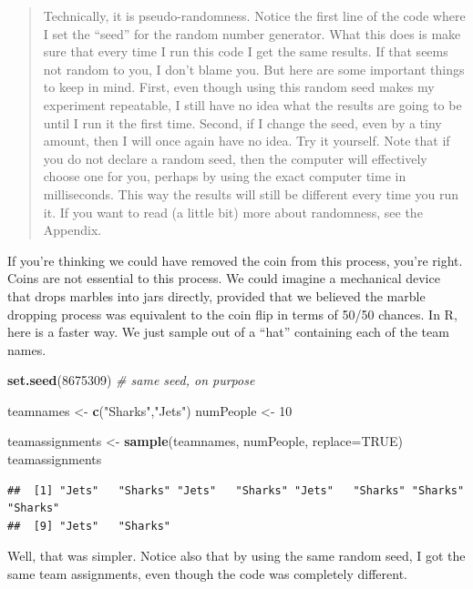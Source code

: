 \documentclass[openany]{book}
\newenvironment{Shaded}{\begin{snugshade}}{\end{snugshade}}
\newcommand{\CommentTok}[1]{\textcolor[rgb]{0.56,0.35,0.01}{\textit{#1}}}
\newcommand{\DataTypeTok}[1]{\textcolor[rgb]{0.13,0.29,0.53}{#1}}
\newcommand{\DecValTok}[1]{\textcolor[rgb]{0.00,0.00,0.81}{#1}}
\newcommand{\KeywordTok}[1]{\textcolor[rgb]{0.13,0.29,0.53}{\textbf{#1}}}
\newcommand{\NormalTok}[1]{#1}
\newcommand{\OtherTok}[1]{\textcolor[rgb]{0.56,0.35,0.01}{#1}}
\newcommand{\StringTok}[1]{\textcolor[rgb]{0.31,0.60,0.02}{#1}}
\begin{document}
\begin{quote}
Technically, it is pseudo-randomness. Notice the first line of the code where I set the ``seed'' for the random number generator. What this does is make sure that every time I run this code I get the same results. If that seems not random to you, I don't blame you. But here are some important things to keep in mind. First, even though using this random seed makes my experiment repeatable, I still have no idea what the results are going to be until I run it the first time. Second, if I change the seed, even by a tiny amount, then I will once again have no idea. Try it yourself. Note that if you do not declare a random seed, then the computer will effectively choose one for you, perhaps by using the exact computer time in milliseconds. This way the results will still be different every time you run it. If you want to read (a little bit) more about randomness, see the Appendix.
\end{quote}

If you're thinking we could have removed the coin from this process, you're right. Coins are not essential to this process. We could imagine a mechanical device that drops marbles into jars directly, provided that we believed the marble dropping process was equivalent to the coin flip in terms of 50/50 chances. In R, here is a faster way. We just sample out of a ``hat'' containing each of the team names.

\begin{Shaded}
\begin{Highlighting}[]
\KeywordTok{set.seed}\NormalTok{(}\DecValTok{8675309}\NormalTok{) }\CommentTok{# same seed, on purpose}

\NormalTok{teamnames <-}\StringTok{ }\KeywordTok{c}\NormalTok{(}\StringTok{"Sharks"}\NormalTok{,}\StringTok{"Jets"}\NormalTok{)}
\NormalTok{numPeople <-}\StringTok{ }\DecValTok{10}

\NormalTok{teamassignments <-}\StringTok{ }\KeywordTok{sample}\NormalTok{(teamnames, numPeople, }\DataTypeTok{replace=}\OtherTok{TRUE}\NormalTok{)}
\NormalTok{teamassignments}
\end{Highlighting}
\end{Shaded}

\begin{verbatim}
##  [1] "Jets"   "Sharks" "Jets"   "Sharks" "Jets"   "Sharks" "Sharks" "Sharks"
##  [9] "Jets"   "Sharks"
\end{verbatim}

Well, that was simpler. Notice also that by using the same random seed, I got the same team assignments, even though the code was completely different.
\end{document}

